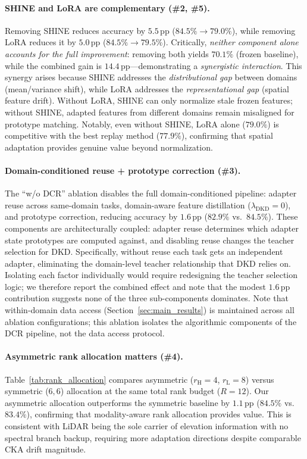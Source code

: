 \paragraph{SHINE and LoRA are complementary (\#2, \#5).}
Removing SHINE reduces accuracy by $5.5$\,pp ($84.5\% \to 79.0\%$), while removing LoRA reduces it by $5.0$\,pp ($84.5\% \to 79.5\%$).
Critically, \emph{neither component alone accounts for the full improvement}: removing both yields $70.1\%$ (frozen baseline), while the combined gain is $14.4$\,pp---demonstrating a \emph{synergistic interaction}.
This synergy arises because SHINE addresses the \emph{distributional gap} between domains (mean/variance shift), while LoRA addresses the \emph{representational gap} (spatial feature drift).
Without LoRA, SHINE can only normalize stale frozen features; without SHINE, adapted features from different domains remain misaligned for prototype matching.
Notably, even without SHINE, LoRA alone ($79.0\%$) is competitive with the best replay method ($77.9\%$), confirming that spatial adaptation provides genuine value beyond normalization.

\paragraph{Domain-conditioned reuse + prototype correction (\#3).}
The ``w/o DCR'' ablation disables the full domain-conditioned pipeline: adapter reuse across same-domain tasks, domain-aware feature distillation ($\lambda_\mathrm{DKD}{=}0$), and prototype correction, reducing accuracy by $1.6$\,pp ($82.9\%$ vs.\ $84.5\%$).
These components are architecturally coupled: adapter reuse determines which adapter state prototypes are computed against, and disabling reuse changes the teacher selection for DKD. Specifically, without reuse each task gets an independent adapter, eliminating the domain-level teacher relationship that DKD relies on. Isolating each factor individually would require redesigning the teacher selection logic; we therefore report the combined effect and note that the modest $1.6$\,pp contribution suggests none of the three sub-components dominates.
Note that within-domain data access (Section~\ref{sec:main_results}) is maintained across all ablation configurations; this ablation isolates the algorithmic components of the DCR pipeline, not the data access protocol.

\paragraph{Asymmetric rank allocation matters (\#4).}
Table~\ref{tab:rank_allocation} compares asymmetric ($r_\mathrm{H}{=}4$, $r_\mathrm{L}{=}8$) versus symmetric ($6,6$) allocation at the same total rank budget ($R{=}12$).
Our asymmetric allocation outperforms the symmetric baseline by $1.1$\,pp ($84.5\%$ vs.\ $83.4\%$), confirming that modality-aware rank allocation provides value.
This is consistent with LiDAR being the sole carrier of elevation information with no spectral branch backup, requiring more adaptation directions despite comparable CKA drift magnitude.

